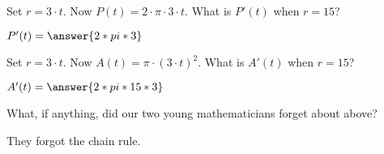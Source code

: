 \documentclass{ximera}
\begin{document}
\begin{problem}
  Set $r=3\cdot t$. Now $P(t) = 2\cdot \pi\cdot 3\cdot t$. What is
  $P'(t)$ when $r=15$?
  \begin{prompt}
    $P'(t)=\answer{2*pi*3}$
  \end{prompt}
\end{problem}

\begin{problem}
  Set $r=3\cdot t$. Now $A(t) = \pi\cdot (3\cdot t)^2$. What is
  $A'(t)$ when $r=15$?
  \begin{prompt}
    $A'(t)=\answer{2*pi*15*3}$
  \end{prompt}
\end{problem}

\begin{problem}
  What, if anything, did our two young mathematicians forget about above?
  \begin{freeResponse}
 They forgot the chain rule.
  \end{freeResponse}
\end{problem}


\end{document}
